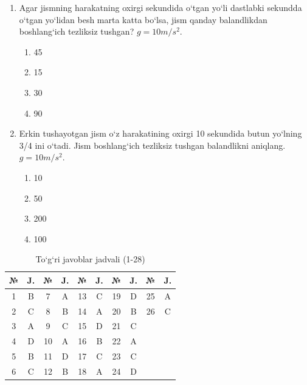 \begin{enumerate}
\item Agar jismning harakatning oxirgi sekundida o‘tgan yo‘li dastlabki sekundda o‘tgan yo‘lidan besh marta katta bo‘lsa, jism qanday balandlikdan boshlang‘ich tezliksiz tushgan? $g=10 m/s^2$.
\begin{enumerate}[label=\Alph*)]
\item 45
\item 15
\item 30
\item 90
\end{enumerate}

\item Erkin tushayotgan jism o‘z harakatining oxirgi 10 sekundida butun yo‘lning 3/4 ini o‘tadi. Jism boshlang‘ich tezliksiz tushgan balandlikni aniqlang. $g=10 m/s^2$.
\begin{enumerate}[label=\Alph*)]
\item 10
\item 50
\item 200
\item 100
\end{enumerate}



\end{enumerate}


\begin{table}[h!]
\centering
\caption{To‘g‘ri javoblar jadvali (1-28)}
\begin{tabular}{|c|c|c|c|c|c|c|c|c|c|}
\hline
№ & J. & № & J. & № & J. & № & J. & № & J. \\ \hline
1 & B & 7 & A & 13 & C & 19 & D & 25 & A \\ \hline
2 & C & 8 & B & 14 & A & 20 & B & 26 & C \\ \hline
3 & A & 9 & C & 15 & D & 21 & C &  &  \\ \hline
4 & D & 10 & A & 16 & B & 22 & A &  &  \\ \hline
5 & B & 11 & D & 17 & C & 23 & C & & \\ \hline
6 & C & 12 & B & 18 & A & 24 & D & & \\ \hline
\end{tabular}
\end{table}
